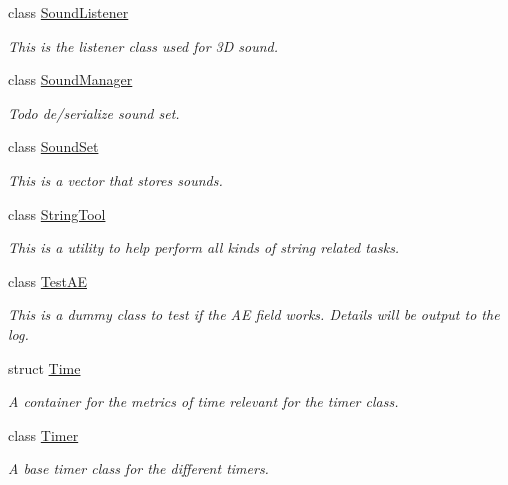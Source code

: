 \begin{DoxyCompactItemize}
class \hyperlink{classphys_1_1SoundListener}{SoundListener}
\begin{DoxyCompactList}\small\item\em This is the listener class used for 3D sound. \item\end{DoxyCompactList}\item 
class \hyperlink{classphys_1_1SoundManager}{SoundManager}
\begin{DoxyCompactList}\small\item\em Todo de/serialize sound set. \item\end{DoxyCompactList}\item 
class \hyperlink{classphys_1_1SoundSet}{SoundSet}
\begin{DoxyCompactList}\small\item\em This is a vector that stores sounds. \item\end{DoxyCompactList}\item 
class \hyperlink{classphys_1_1StringTool}{StringTool}
\begin{DoxyCompactList}\small\item\em This is a utility to help perform all kinds of string related tasks. \item\end{DoxyCompactList}\item 
class \hyperlink{classphys_1_1TestAE}{TestAE}
\begin{DoxyCompactList}\small\item\em This is a dummy class to test if the AE field works. Details will be output to the log. \item\end{DoxyCompactList}\item 
struct \hyperlink{structphys_1_1Time}{Time}
\begin{DoxyCompactList}\small\item\em A container for the metrics of time relevant for the timer class. \item\end{DoxyCompactList}\item 
class \hyperlink{classphys_1_1Timer}{Timer}
\begin{DoxyCompactList}\small\item\em A base timer class for the different timers. \item\end{DoxyCompactList}\item 

\end{DoxyCompactItemize}
